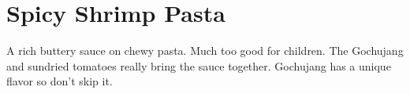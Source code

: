 \section[Shrimp Pasta]{Spicy Shrimp Pasta}

\begin{recipestats}[
        servings=4,
        preptime=30~\minute,
        bakingtime=15~\minute,
        source=Jane \& Mike,
        original=\citeauthor{realSimpleShrimpPasta}~\cite{realSimpleShrimpPasta},
    ]
\end{recipestats}

\begin{recipeabstract}
    A rich buttery sauce on chewy pasta.
    Much too good for children.
    The Gochujang and sundried tomatoes really bring the sauce together.
    Gochujang has a unique flavor so don't skip it.
\end{recipeabstract}

\begin{ingredientcolumns}
    \begin{ingredientblock}
        \\
        \\
        \\
        \\
        \\
    \end{ingredientblock}
    \begin{ingredientblock}
        \\
        \\
        \\
        \\
    \end{ingredientblock}
\end{ingredientcolumns}

